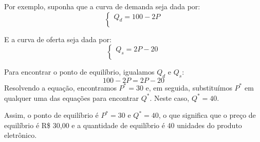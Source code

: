 \begin{example}{}{}
Por exemplo, suponha que a curva de demanda seja dada por:
\[\begin{cases}Q_d = 100 - 2P \\\end{cases}\]

E a curva de oferta seja dada por:
\[\begin{cases}Q_s = 2P - 20 \\\end{cases}\]

Para encontrar o ponto de equilíbrio, igualamos \(Q_d\) e \(Q_s\):
\[100 - 2P = 2P - 20\]
Resolvendo a equação, encontramos \(P^* = 30\) e, em seguida, substituímos \(P^*\) em qualquer uma das equações para encontrar \(Q^*\). Neste caso, \(Q^* = 40\).

Assim, o ponto de equilíbrio é \(P^* = 30\) e \(Q^* = 40\), o que significa que o preço de equilíbrio é R\$ 30,00 e a quantidade de equilíbrio é 40 unidades do produto eletrônico.

\end{example}




